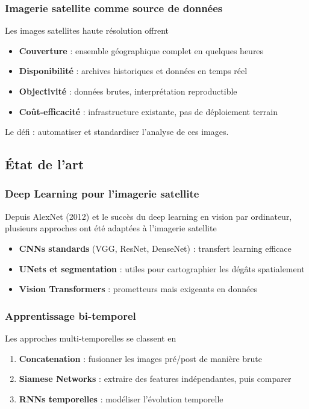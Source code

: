 \subsubsection{Imagerie satellite comme source de données}
Les images satellites haute résolution offrent\:

\begin{itemize}
    \item \textbf{Couverture} : ensemble géographique complet en quelques heures
    \item \textbf{Disponibilité} : archives historiques et données en temps réel
    \item \textbf{Objectivité} : données brutes, interprétation reproductible
    \item \textbf{Coût-efficacité} : infrastructure existante, pas de déploiement terrain
\end{itemize}

Le défi : automatiser et standardiser l'analyse de ces images.

\subsection{État de l'art}

\subsubsection{Deep Learning pour l'imagerie satellite}
Depuis AlexNet (2012) et le succès du deep learning en vision par ordinateur, plusieurs approches 
ont été adaptées à l'imagerie satellite\:

\begin{itemize}
    \item \textbf{CNNs standards} (VGG, ResNet, DenseNet) : transfert learning efficace
    \item \textbf{UNets et segmentation} : utiles pour cartographier les dégâts spatialement
    \item \textbf{Vision Transformers} : prometteurs mais exigeants en données
\end{itemize}

\subsubsection{Apprentissage bi-temporel}
Les approches multi-temporelles se classent en\:

\begin{enumerate}
    \item \textbf{Concatenation} : fusionner les images pré/post de manière brute
    \item \textbf{Siamese Networks} : extraire des features indépendantes, puis comparer
    \item \textbf{RNNs temporelles} : modéliser l'évolution temporelle
\end{enumerate}

